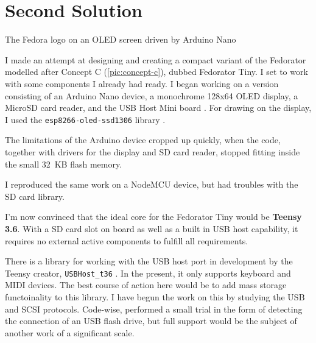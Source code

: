 \chapter{Second Solution}
    
        {The Fedora logo on an OLED screen driven by Arduino Nano}
    
    I made an attempt at designing and creating a compact variant of the Fedorator modelled after Concept C  (\ref{pic:concept-c}), dubbed Fedorator Tiny.  I set to work with some components I already had ready.  I began working on a version consisting of an Arduino Nano device, a monochrome 128x64 OLED display, a MicroSD card reader, and the USB Host Mini board \cite{usb-host-shield}.  For drawing on the display, I used the \texttt{esp8266-oled-ssd1306} library \cite{esp8266-oled-ssd1306}.
    
    The limitations of the Arduino device cropped up quickly, when the code, together with drivers for the display and SD card reader, stopped fitting inside the small 32~KB flash memory.
    
    I reproduced the same work on a NodeMCU device, but had troubles with the SD card library.
    
    I'm now convinced that the ideal core for the Fedorator Tiny would be \textbf{Teensy 3.6}.  With a SD card slot on board as well as a built in USB host capability, it requires no external active components to fulfill all requirements.
    
    There is a library for working with the USB host port in development by the Teensy creator, \texttt{USBHost\_t36} \cite{usbhost_t36}.  In the present, it only supports keyboard and MIDI devices.  The best course of action here would be to add mass storage functoinality to this library.  I have begun the work on this by studying the USB and SCSI protocols.  Code-wise, performed a small trial in the form of detecting the connection of an USB flash drive, but full support would be the subject of another work of a significant scale.
    
    
    
